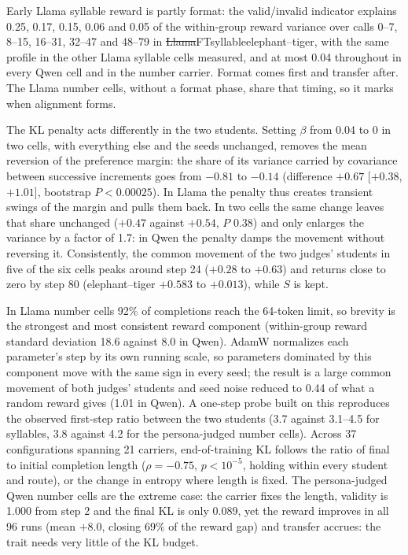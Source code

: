 Early Llama syllable reward is partly format: the valid/invalid indicator explains 0.25, 0.17, 0.15, 0.06 and 0.05 of the within-group reward variance over calls 0--7, 8--15, 16--31, 32--47 and 48--79 in \st{Llama}{FT}{syllable}{elephant--tiger}, with the same profile in the other Llama syllable cells measured, and at most 0.04 throughout in every Qwen cell and in the number carrier. Format comes first and transfer after. The Llama number cells, without a format phase, share that timing, so it marks when alignment forms.

The KL penalty acts differently in the two students. Setting $\beta$ from 0.04 to 0 in two  cells, with everything else and the seeds unchanged, removes the mean reversion of the preference margin: the share of its variance carried by covariance between successive increments goes from $-0.81$ to $-0.14$ (difference $+0.67$ [$+0.38$, $+1.01$], bootstrap $P<0.00025$). In Llama the penalty thus creates transient swings of the margin and pulls them back. In two  cells the same change leaves that share unchanged ($+0.47$ against $+0.54$, $P$ 0.38) and only enlarges the variance by a factor of 1.7: in Qwen the penalty damps the movement without reversing it. Consistently, the common movement of the two judges' students in five of the six  cells peaks around step 24 ($+0.28$ to $+0.63$) and returns close to zero by step 80 (elephant--tiger $+0.583$ to $+0.013$), while $S$ is kept.

In Llama number cells 92\% of completions reach the 64-token limit, so brevity is the strongest and most consistent reward component (within-group reward standard deviation 18.6 against 8.0 in Qwen). AdamW normalizes each parameter's step by its own running scale, so parameters dominated by this component move with the same sign in every seed; the result is a large common movement of both judges' students and seed noise reduced to 0.44 of what a random reward gives (1.01 in Qwen). A one-step probe built on this reproduces the observed first-step ratio between the two students (3.7 against 3.1--4.5 for syllables, 3.8 against 4.2 for the persona-judged number cells). Across 37 configurations spanning 21 carriers, end-of-training KL follows the ratio of final to initial completion length ($\rho = -0.75$, $p < 10^{-5}$, holding within every student and route), or the change in entropy where length is fixed. The persona-judged Qwen number cells are the extreme case: the carrier fixes the length, validity is 1.000 from step 2 and the final KL is only 0.089, yet the reward improves in all 96 runs (mean $+8.0$, closing 69\% of the reward gap) and transfer accrues: the trait needs very little of the KL budget.

